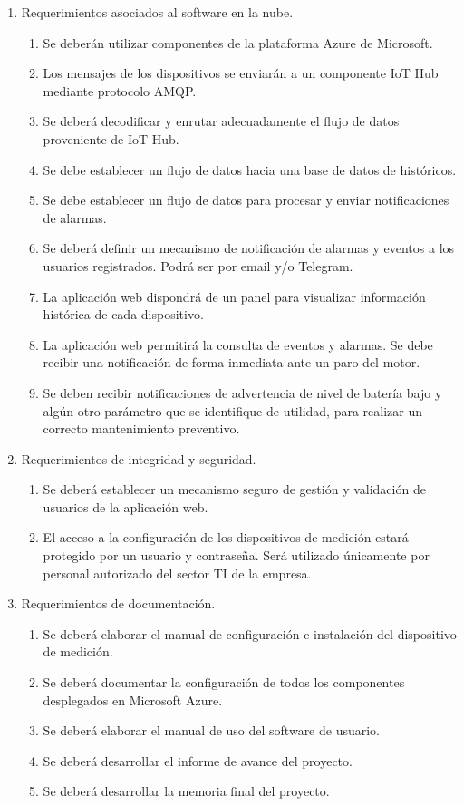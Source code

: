 \documentclass[
11pt, %
]{charter}
\begin{document}
\begin{enumerate}
	\item Requerimientos asociados al software en la nube.
		\begin{enumerate}
			\item Se deberán utilizar componentes de la plataforma Azure de Microsoft.
			\item Los mensajes de los dispositivos se enviarán a un componente IoT Hub mediante protocolo AMQP.
			\item Se deberá decodificar y enrutar adecuadamente el flujo de datos proveniente de IoT Hub.
			\item Se debe establecer un flujo de datos hacia una base de datos de históricos.
			\item Se debe establecer un flujo de datos para procesar y enviar notificaciones de alarmas.
			\item Se deberá definir un mecanismo de notificación de alarmas y eventos a los usuarios registrados. Podrá ser por email y/o Telegram.
			\item La aplicación web dispondrá de un panel para visualizar información histórica de cada dispositivo.
			\item La aplicación web permitirá la consulta de eventos y alarmas.
Se debe recibir una notificación de forma inmediata ante un paro del motor.
			\item Se deben recibir notificaciones de advertencia de nivel de batería bajo y algún otro parámetro que se identifique de utilidad, para realizar un correcto mantenimiento preventivo.
		\end{enumerate}

	\item Requerimientos de integridad y seguridad.
		\begin{enumerate}
			\item Se deberá establecer un mecanismo seguro de gestión y validación de usuarios de la aplicación web.
			\item El acceso a la configuración de los dispositivos de medición estará protegido por un usuario y contraseña. Será utilizado únicamente por personal autorizado del sector TI de la empresa.
		\end{enumerate}
	
	\item Requerimientos de documentación.
		\begin{enumerate}
			\item Se deberá elaborar el manual de configuración e instalación del dispositivo de medición.			
			\item Se deberá documentar la configuración de todos los componentes desplegados en Microsoft Azure.
			\item Se deberá elaborar el manual de uso del software de usuario.
			\item Se deberá desarrollar el informe de avance del proyecto.
			\item Se deberá desarrollar la memoria final del proyecto.
		\end{enumerate}
		
	\end{enumerate}
\end{document}
